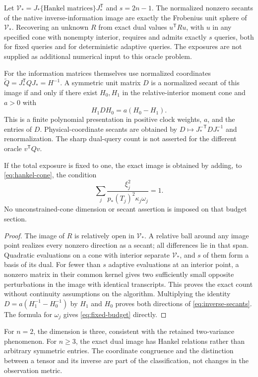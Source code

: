 \begin{corollary}\label{cor:hankel-secants}
Let $\mathcal V_*=J_*\{\text{Hankel matrices}\}J_*^{\mathsf T}$ and
$s=2n-1$. The normalized nonzero secants of the native inverse-information
image are exactly the Frobenius unit sphere of $\mathcal V_*$. Recovering
an unknown $R$ from exact dual values $u^{\mathsf T}Ru$, with $u$ in any
specified cone with nonempty interior, requires and admits exactly $s$
queries, both for fixed queries and for deterministic adaptive queries.
The exposures are not supplied as additional numerical input to this
oracle problem.

For the information matrices themselves use normalized coordinates
$\widetilde Q=J_*^{\mathsf T}QJ_*=H^{-1}$. A symmetric unit matrix $D$
is a normalized secant of this image if and only if there exist
$H_0,H_1$ in the relative-interior moment cone and $a>0$ with
\begin{equation}\label{eq:inverse-secants}
 H_1DH_0=a(H_0-H_1).
\end{equation}
This is a finite polynomial presentation in positive clock weights,
$a$, and the entries of $D$. Physical-coordinate secants are obtained by
$D\mapsto J_*^{-\mathsf T}DJ_*^{-1}$ and renormalization.
The sharp dual-query count is not asserted for the different oracle
$v^{\mathsf T}Qv$.

If the total exposure is fixed to one, the exact image is obtained by
adding, to \eqref{eq:hankel-cone}, the condition
\begin{equation}\label{eq:fixed-budget}
 \sum_j\frac{\xi_j^2}{p_*(T_j)^2\kappa_j\omega_j}=1.
\end{equation}
No unconstrained-cone dimension or secant assertion is imposed on that
budget section.
\end{corollary}
\begin{proof}
The image of $R$ is relatively open in $\mathcal V_*$. A relative ball
around any image point realizes every nonzero direction as a secant;
all differences lie in that span. Quadratic evaluations on a cone with
interior separate $\mathcal V_*$, and $s$ of them form a basis of its
dual. For fewer than $s$ adaptive evaluations at an interior point,
a nonzero matrix in their common kernel gives two sufficiently small
opposite perturbations in the image with identical transcripts. This
proves the exact count without continuity assumptions on the algorithm.
Multiplying the identity
$D=a(H_1^{-1}-H_0^{-1})$ by $H_1$ and $H_0$ proves both directions of
\eqref{eq:inverse-secants}. The formula for $\omega_j$ gives
\eqref{eq:fixed-budget} directly.
\end{proof}
For $n=2$, the dimension is three, consistent with the retained
 two-variance phenomenon. For $n\ge3$, the exact dual image has Hankel
relations rather than arbitrary symmetric entries. The coordinate
congruence and the distinction between a tensor and its inverse are
part of the classification, not changes in the observation metric.

